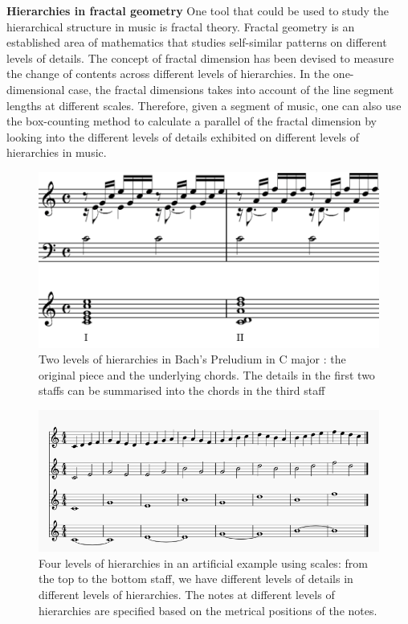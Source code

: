 \textbf{Hierarchies in fractal geometry}
One tool that could be used to study the hierarchical structure in music is fractal theory.
Fractal geometry is an established area of mathematics that studies self-similar patterns on different levels of details.
The concept of fractal dimension has been devised to measure the change of contents across different levels of hierarchies.
In the one-dimensional case, the fractal dimensions takes into account of the line segment lengths at different scales.
Therefore, given a segment of music, one can also use the box-counting method to calculate a parallel of the fractal dimension by looking into the different levels of details exhibited on different levels of hierarchies in music.
\begin{figure}
  \includegraphics[width=\linewidth]{src/img/eg.png}
  \caption{Two levels of hierarchies in Bach's Preludium in C major \cite{wiki:bach}: the original piece and the underlying chords.
          The details in the first two staffs can be summarised into the chords in the third staff}
  \label{fig:egbach}
\end{figure}

\begin{figure}
  \includegraphics[width=\linewidth]{src/img/egscale.png}
  \caption{Four levels of hierarchies in an artificial example using scales: from the top to the bottom staff, we have different levels of details in different levels of hierarchies.
    The notes at different levels of hierarchies are specified based on the metrical positions of the notes.}
  \label{fig:egscale}
\end{figure}

